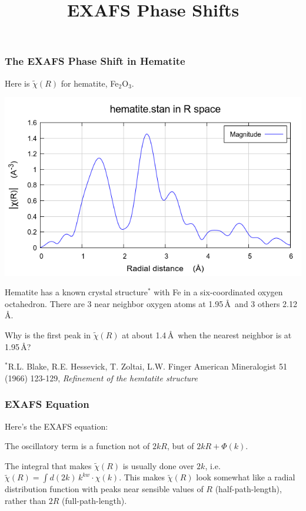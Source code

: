 \documentclass[10pt, xcolor=x11names, compress]{beamer}
\title{EXAFS Phase Shifts}
\begin{document}
\maketitle
%


\begin{frame}
  \frametitle{The EXAFS Phase Shift in Hematite}

  \small
  Here is $\tilde\chi(R)$ for hematite, Fe$_2$O$_3$.
  
  \begin{center}
    \includegraphics[width=0.5\linewidth]{hematite_chir.png}
  \end{center}

  Hematite has a known crystal structure$^\ast$ with Fe in a
  six-coordinated oxygen octahedron.  There are 3 near neighbor oxygen
  atoms at 1.95\,\AA\ and 3 others 2.12\,\AA.

  \vspace{-2ex}
  
  \begin{center}
    \begin{minipage}{0.8\linewidth}
      \begin{alertblock}{}
        Why is the first peak in $\tilde\chi(R)$ at about 1.4\,\AA\
        when the nearest neighbor is at 1.95\,\AA?
      \end{alertblock}
    \end{minipage}
  \end{center}
  \begin{bottomnote}[0.5][19]%
    $^\ast$R.L. Blake, R.E. Hessevick, T. Zoltai, L.W. Finger
    American Mineralogist 51 (1966) 123-129, \textit{Refinement of
      the hemtatite structure}
  \end{bottomnote}

\end{frame}

\begin{frame}
  \frametitle{EXAFS Equation}
  \small
  Here's the EXAFS equation:

  \exafsequation

  The oscillatory term is a function not of $2kR$, but of
  \alert{$2kR + \Phi(k)$}.
  

  \bigskip
  
  The integral that makes $\tilde\chi(R)$ is usually done over $2k$,
  i.e. $\tilde\chi(R) = \int d(2k)\, k^{kw}\cdot\chi(k)$.  This makes
  $\tilde\chi(R)$ look somewhat like a radial distribution function
  with peaks near sensible values of $R$ (half-path-length), rather
  than $2R$ (full-path-length).
\end{frame}
\end{document}
